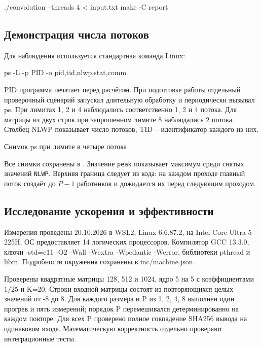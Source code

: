 \documentclass[12pt,a4paper]{article}
\begin{document}
\begin{terminal}
./convolution --threads 4 < input.txt
make -C report
\end{terminal}

\subsection{Демонстрация числа потоков}

Для наблюдения используется стандартная команда Linux:
\begin{terminal}
ps -L -p PID -o pid,tid,nlwp,stat,comm
\end{terminal}

PID программа печатает перед расчётом. При подготовке работы отдельный проверочный сценарий запускал длительную обработку и периодически вызывал ps. При лимитах 1, 2 и 4 наблюдались соответственно 1, 2 и 4 потока. Для матрицы из двух строк при запрошенном лимите 8 наблюдались 2 потока. Столбец NLWP показывает число потоков, TID -- идентификатор каждого из них.

\begin{listingblock}{Снимок ps при лимите в четыре потока}
\end{listingblock}

Все снимки сохранены в . Значение \texttt{peak} показывает максимум среди снятых значений \texttt{NLWP}. Верхняя граница следует из кода: на каждом проходе главный поток создаёт до $P-1$ работников и дожидается их перед следующим проходом.

\subsection{Исследование ускорения и эффективности}

Измерения проведены 20.10.2026 в WSL2, Linux 6.6.87.2, на Intel Core Ultra 5 225H; ОС предоставляет 14 логических процессоров. Компилятор GCC 13.3.0, ключи -std=c11 -O2 -Wall -Wextra -Wpedantic -Werror, библиотеки pthread и libm. Подробности окружения сохранены в inc/machine.json.

Проверены квадратные матрицы 128, 512 и 1024, ядро 5 на 5 с коэффициентами $1/25$ и K=20. Строки входной матрицы состоят из повторяющихся целых значений от -8 до 8. Для каждого размера и P из 1, 2, 4, 8 выполнен один прогрев и пять измерений; порядок P перемешивался детерминированно на каждом повторе. Для всех P проверено полное совпадение SHA256 вывода на одинаковом входе. Математическую корректность отдельно проверяют интеграционные тесты.
\end{document}
